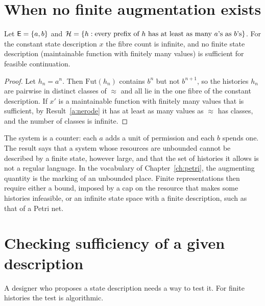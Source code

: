 \section{When no finite augmentation exists}

\begin{newresult}\label{prop:no-finite}
Let $\mathsf{E}=\{a,b\}$ and $\mathcal{H}=\{h:\text{every prefix of }h\text{ has at least as many }a\text{'s as }b\text{'s}\}$. For the constant state description $x$ the fibre count is infinite, and no finite state description (maintainable function with finitely many values) is sufficient for feasible continuation.
\end{newresult}
\begin{proof}
Let $h_n=a^{n}$. Then $\mathrm{Fut}(h_n)$ contains $b^{n}$ but not $b^{n+1}$, so the histories $h_n$ are pairwise in distinct classes of $\approx$ and all lie in the one fibre of the constant description. If $x'$ is a maintainable function with finitely many values that is sufficient, by Result~\ref{a:nerode} it has at least as many values as $\approx$ has classes, and the number of classes is infinite.
\end{proof}

The system is a counter: each $a$ adds a unit of permission and each $b$ spends one. The result says that a system whose resources are unbounded cannot be described by a finite state, however large, and that the set of histories it allows is not a regular language. In the vocabulary of Chapter~\ref{ch:petri}, the augmenting quantity is the marking of an unbounded place. Finite representations then require either a bound, imposed by a cap on the resource that makes some histories infeasible, or an infinite state space with a finite description, such as that of a Petri net.


\section{Checking sufficiency of a given description}\label{sec:check-suff}

A designer who proposes a state description needs a way to test it. For finite histories the test is algorithmic.

